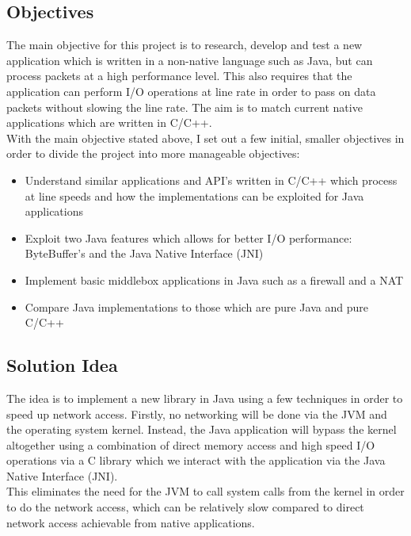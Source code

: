 \documentclass[interim_report.tex]{subfiles}
\begin{document}
\subsection{Objectives}
The main objective for this project is to research, develop and test a new application which is written in a non-native language such as Java, but can process packets at a high performance level. This also requires that the application can perform I/O operations at line rate in order to pass on data packets without slowing the line rate. The aim is to match current native applications which are written in C/C++. \\
\newline
With the main objective stated above, I set out a few initial, smaller objectives in order to divide the project into more manageable objectives:
\begin{itemize}
	\item Understand similar applications and API's written in C/C++ which process at line speeds and how the implementations can be exploited for Java applications
	\item Exploit two Java features which allows for better I/O performance: ByteBuffer's and the Java Native Interface (JNI)
	\item Implement basic middlebox applications in Java such as a firewall and a NAT
	\item Compare Java implementations to those which are pure Java and pure C/C++
\end{itemize}

\subsection{Solution Idea}
The idea is to implement a new library in Java using a few techniques in order to speed up network access. Firstly, no networking will be done via the JVM and the operating system kernel. Instead, the Java application will bypass the kernel altogether using a combination of direct memory access and high speed I/O operations via a C library which we interact with the application via the Java Native Interface (JNI). \\
\newline
This eliminates the need for the JVM to call system calls from the kernel in order to do the network access, which can be relatively slow compared to direct network access achievable from native applications.
\end{document}
